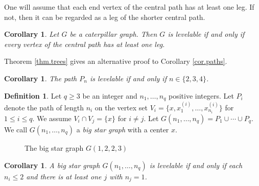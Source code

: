 \documentclass[12pt]{amsart}
\numberwithin{equation}{section}
\newtheorem{corollary}[theorem]{Corollary}
\theoremstyle{definition}
\newtheorem{definition}[theorem]{Definition}
\newcounter{i} %
\begin{document}
One will assume that each end vertex of the central path has at least one leg.  If not, then it can be regarded as a leg of 
the shorter
central path.

\begin{corollary}
\label{cat}
Let $G$ be a caterpillar graph.  Then $G$ is levelable if and only if every vertex of the central path has at least one leg.    
\end{corollary}

Theorem \ref{thm.trees} gives an alternative proof to 
Corollary \ref{cor.paths}.

\begin{corollary}
\label{PATH}
The path $P_n$ is levelable if and only 
if $n \in \{2,3,4\}$.
\end{corollary}



\begin{definition}
Let $q \geq 3$ be an integer and $n_1, \ldots, n_q$ positive integers.  Let $P_i$ denote the path of length $n_i$ on the vertex set $V_i=\{x, x_1^{(i)}, \ldots, x_{n_i}^{(i)}\}$ for $1 \leq i \leq q$.  We assume $V_i \cap V_j = \{x\}$ for $i \neq j$.  Let $G(n_1, \ldots, n_q) = P_1 \cup \cdots \cup P_q$.  We call $G(n_1, \ldots, n_q)$ a {\it big star graph} with a center $x$. 
\end{definition}


\begin{figure}[h]
\centering
{}
\caption{The big star graph $G(1,2,2,3)$} \label{bigstar}
\end{figure}




\begin{corollary}
\label{star}
A big star graph $G(n_1, \ldots, n_q)$ is levelable if and only if each $n_i \leq 2$ and there is at least 
one $j$ with $n_j = 1$.  
\end{corollary}
\end{document}
